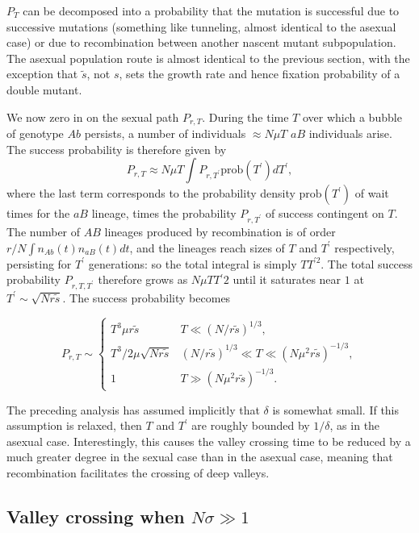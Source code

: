 \documentclass[10pt]{revtex4}
\begin{document}
$P_T$ can be decomposed into a probability that the mutation is successful due to successive mutations (something like tunneling, almost identical to the asexual case) or due to recombination between another nascent mutant subpopulation.
The asexual population route is almost identical to the previous section, with the exception that $\tilde{s}$, not $s$, sets the growth rate and hence fixation probability of a double mutant.

We now zero in on the sexual path $P_{r,T}$.
During the time $T$ over which a bubble of genotype $Ab$ persists, a number of individuals $\approx N\mu T$ $aB$ individuals arise.
The success probability is therefore given by
\begin{equation}
P_{r,T} \approx N\mu T \int P_{r,T^\prime} \mathrm{prob} (T^\prime) dT^\prime,
\end{equation} where the last term corresponds to the probability density $\mathrm{prob}(T^\prime)$ of wait times for the $aB$ lineage, times the probability $P_{r,T^\prime}$ of success contingent on $T$.
The number of $AB$ lineages produced by recombination is of order $r/N \int n_{Ab}(t) n_{aB}(t) dt$, and the lineages reach sizes of $T$ and $T^\prime$ respectively, persisting for $T^\prime$ generations: so the total integral is simply $TT^{\prime 2}$.
The total success probability $P_{r,T,T^\prime}$ therefore grows as $N\mu TT{^\prime 2}$ until it saturates near $1$ at $T^\prime \sim \sqrt{Nr\tilde{s}}$.
The success probability becomes

\begin{equation}
P_{r,T} \sim
\begin{cases}
T^3 \mu r \tilde{s} & T \ll (N/r\tilde{s})^{1/3}, \\
T^3/2 \mu \sqrt{Nr \tilde{s}} & (N/r\tilde{s})^{1/3} \ll T \ll (N\mu^2r\tilde{s})^{-1/3}, \\
1 & T \gg (N\mu^2r\tilde{s})^{-1/3}.
\end{cases}
\end{equation}


The preceding analysis has assumed implicitly that $\delta$ is somewhat small.
If this assumption is relaxed, then $T$ and $T^\prime$ are roughly bounded by $1/\delta$, as in the asexual case.
Interestingly, this causes the valley crossing time to be reduced by a much greater degree in the sexual case than in the asexual case, meaning that recombination facilitates the crossing of deep valleys.

\subsection{Valley crossing when $N\sigma \gg 1$}
\end{document}
